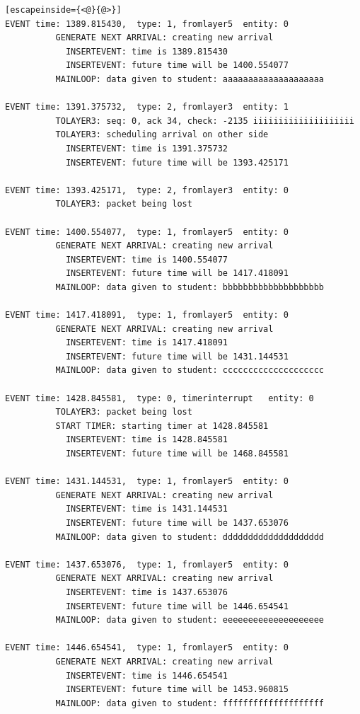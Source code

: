 \documentclass[paper=a4, fontsize=11pt]{scrartcl}
\numberwithin{equation}{section}		%
\numberwithin{figure}{section}			%
\numberwithin{table}{section}				%
\begin{document}
\begin{lstlisting}[escapeinside={<@}{@>}]
EVENT time: 1389.815430,  type: 1, fromlayer5  entity: 0
          GENERATE NEXT ARRIVAL: creating new arrival
            INSERTEVENT: time is 1389.815430
            INSERTEVENT: future time will be 1400.554077
          MAINLOOP: data given to student: aaaaaaaaaaaaaaaaaaaa

EVENT time: 1391.375732,  type: 2, fromlayer3  entity: 1
          TOLAYER3: seq: 0, ack 34, check: -2135 iiiiiiiiiiiiiiiiiiii
          TOLAYER3: scheduling arrival on other side
            INSERTEVENT: time is 1391.375732
            INSERTEVENT: future time will be 1393.425171

EVENT time: 1393.425171,  type: 2, fromlayer3  entity: 0
          TOLAYER3: packet being lost

EVENT time: 1400.554077,  type: 1, fromlayer5  entity: 0
          GENERATE NEXT ARRIVAL: creating new arrival
            INSERTEVENT: time is 1400.554077
            INSERTEVENT: future time will be 1417.418091
          MAINLOOP: data given to student: bbbbbbbbbbbbbbbbbbbb

EVENT time: 1417.418091,  type: 1, fromlayer5  entity: 0
          GENERATE NEXT ARRIVAL: creating new arrival
            INSERTEVENT: time is 1417.418091
            INSERTEVENT: future time will be 1431.144531
          MAINLOOP: data given to student: cccccccccccccccccccc

EVENT time: 1428.845581,  type: 0, timerinterrupt   entity: 0
          TOLAYER3: packet being lost
          START TIMER: starting timer at 1428.845581
            INSERTEVENT: time is 1428.845581
            INSERTEVENT: future time will be 1468.845581

EVENT time: 1431.144531,  type: 1, fromlayer5  entity: 0
          GENERATE NEXT ARRIVAL: creating new arrival
            INSERTEVENT: time is 1431.144531
            INSERTEVENT: future time will be 1437.653076
          MAINLOOP: data given to student: dddddddddddddddddddd

EVENT time: 1437.653076,  type: 1, fromlayer5  entity: 0
          GENERATE NEXT ARRIVAL: creating new arrival
            INSERTEVENT: time is 1437.653076
            INSERTEVENT: future time will be 1446.654541
          MAINLOOP: data given to student: eeeeeeeeeeeeeeeeeeee

EVENT time: 1446.654541,  type: 1, fromlayer5  entity: 0
          GENERATE NEXT ARRIVAL: creating new arrival
            INSERTEVENT: time is 1446.654541
            INSERTEVENT: future time will be 1453.960815
          MAINLOOP: data given to student: ffffffffffffffffffff


\end{lstlisting}
\end{document}

